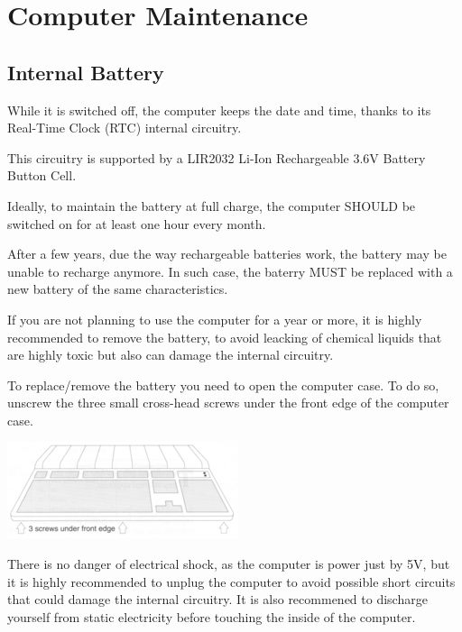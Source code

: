 \section{Computer Maintenance}

    \subsection{Internal Battery}

    While it is switched off, the computer keeps the date and time, thanks to
    its Real-Time Clock (RTC) internal circuitry.

    This circuitry is supported by a LIR2032 Li-Ion Rechargeable 3.6V Battery
    Button Cell.

    Ideally, to maintain the battery at full charge, the computer SHOULD be
    switched on for at least one hour every month.

    After a few years, due the way rechargeable batteries work, the battery may
    be unable to recharge anymore. In such case, the baterry MUST be replaced
    with a new battery of the same characteristics.

    If you are not planning to use the computer for a year or more, it is highly
    recommended to remove the battery, to avoid leacking of chemical liquids
    that are highly toxic but also can damage the internal circuitry.

    To replace/remove the battery you need to open the computer case. To do so,
    unscrew the three small cross-head screws under the front edge of the
    computer case.

    \centerline{\includegraphics[scale=1]{images/keyboardscrews.png}}

    There is no danger of electrical shock, as the computer is power just by 5V,
    but it is highly recommended to unplug the computer to avoid possible short
    circuits that could damage the internal circuitry. It is also recommened to
    discharge yourself from static electricity before touching the inside of the
    computer.

